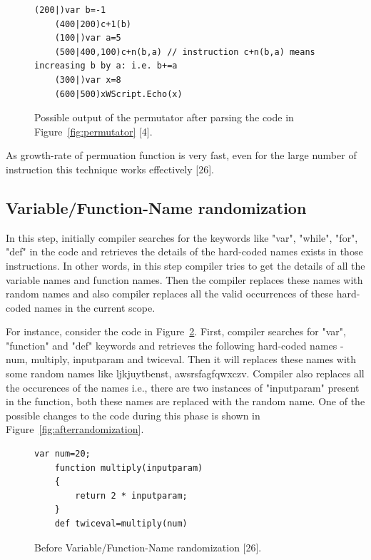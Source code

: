 \begin{figure}
  \centering
  \begin{lstlisting}[language=myasm]
	(200|)var b=-1
	(400|200)c+1(b)
	(100|)var a=5	
	(500|400,100)c+n(b,a) // instruction c+n(b,a) means increasing b by a: i.e. b+=a
	(300|)var x=8
	(600|500)xWScript.Echo(x)
\end{lstlisting}
    \caption[Permutator output]{Possible output of the permutator after parsing the code in Figure~\ref{fig:permutator} [4].}
    \label{fig:afterpermutator}
\end{figure}

As growth-rate of permuation function is very fast, even for the large number of instruction this technique works effectively [26].

\subsection{Variable/Function-Name randomization}

In this step, initially compiler searches for the keywords like "var", "while", "for", "def" in the code and retrieves the details of the hard-coded names exists in those instructions. In other words, in this step compiler tries to get the details of all the variable names and function names. Then the compiler replaces these names with random names and also compiler replaces all the valid occurrences of these hard-coded names in the current scope.

For instance, consider the code in Figure~\ref{fig:randomization}. First, compiler searches for "var", "function" and "def" keywords and retrieves the following hard-coded names - num, multiply, inputparam and twiceval. Then it will replaces these names with some random names like ljkjuytbenst, awsrsfagfqwxczv. Compiler also replaces all the occurences of the names i.e., there are two instances of "inputparam" present in the function, both these names are replaced with the random name. One of the possible changes to the code during this phase is shown in Figure~\ref{fig:afterrandomization}. 

\begin{figure}
  \centering
  \begin{lstlisting}[language=myasm]
	var num=20;
	function multiply(inputparam) 
	{ 
		return 2 * inputparam; 
	}
	def twiceval=multiply(num)
\end{lstlisting}
    \caption[Before Variable/Function-Name randomization]{Before Variable/Function-Name randomization [26].}
    \label{fig:randomization}
\end{figure}


